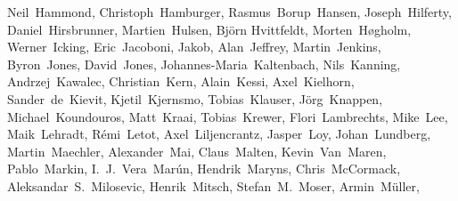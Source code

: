 \begin{flushleft}
  Neil~Hammond,           %
  Christoph~Hamburger,    %
  Rasmus~Borup~Hansen,    %
  Joseph~Hilferty,        %
  Daniel~Hirsbrunner,     %
  Martien~Hulsen,         %
  Bj\"orn Hvittfeldt,     %
  Morten~H\o gholm,       %
  Werner~Icking,          %
  Eric~Jacoboni,          %
  Jakob,                  %
  Alan~Jeffrey,           %
  Martin~Jenkins,         %
  Byron~Jones,            %
  David~Jones,            %
  Johannes-Maria~Kaltenbach, %
  Nils~Kanning,           %
  Andrzej~Kawalec,        %
  Christian~Kern,         %
  Alain~Kessi,            %
  Axel~Kielhorn,          %
  Sander~de~Kievit,       %
  Kjetil~Kjernsmo,        %
  Tobias~Klauser,		%
  J\"org~Knappen,         %
  Michael~Koundouros,     %
  Matt~Kraai,             %
  Tobias~Krewer,          %
  Flori~Lambrechts,       %
  Mike~Lee,               %
  Maik~Lehradt,           %
  R\'emi~Letot,           %
  Axel~Liljencrantz,	%
  Jasper~Loy,             %
  Johan~Lundberg,         %
  Martin~Maechler,        %
  Alexander~Mai,          %
  Claus~Malten,           %
  Kevin~Van~Maren,        %
  Pablo~Markin,
  I.~J.~Vera~Mar\'un,     %
  Hendrik~Maryns,         %
  Chris~McCormack,        %
  Aleksandar~S.~Milosevic, %
  Henrik~Mitsch,          %
  Stefan~M.~Moser,        %
  Armin~M\"uller,		%

\end{flushleft}
